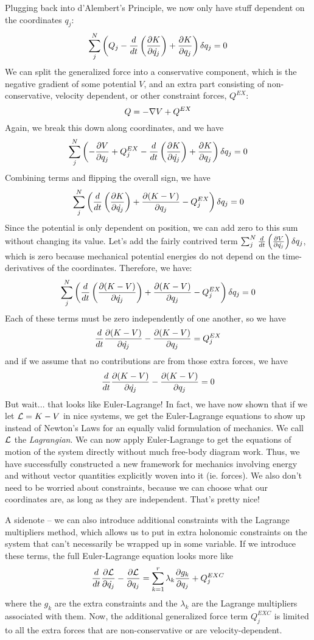 Plugging back into d'Alembert's Principle, we now only have stuff dependent on the coordinates $q_j$:
\[
	\sum_j^N \left(Q_j - \frac{d }{d t} \left( \frac{\partial K}{\partial \dot{q_j}} \right) + \frac{\partial K}{\partial q_j} \right) \delta q_j = 0
\]
We can split the generalized force into a conservative component, which is the negative gradient of some potential $V$, and an extra part consisting of non-conservative, velocity dependent, or other constraint forces, $Q^{EX}$: 
\[
	Q = -\nabla V + Q^{EX}
\]
Again, we break this down along coordinates, and we have
\[
	\sum_j^N \left(-\frac{\partial V}{\partial q_j} + Q^{EX}_j - \frac{d }{d t} \left( \frac{\partial K}{\partial \dot{q_j}} \right) + \frac{\partial K}{\partial q_j} \right) \delta q_j = 0
\]
Combining terms and flipping the overall sign, we have
\[
\sum_j^N \left(\frac{d }{d t} \left( \frac{\partial K}{\partial \dot{q_j}} \right) + \frac{\partial (K-V)}{\partial q_j} - Q^{EX}_j \right) \delta q_j = 0
\]
Since the potential is only dependent on position, we can add zero to this sum without changing its value. Let's add the fairly contrived term $\sum_j^N \frac{d }{d t} \left(\frac{\partial V}{\partial \dot{q_j}}  \right) \delta q_j $, which is zero because mechanical potential energies do not depend on the time-derivatives of the coordinates. Therefore, we have: 
\[
\sum_j^N \left(\frac{d }{d t} \left( \frac{\partial (K-V)}{\partial \dot{q_j}} \right) + \frac{\partial (K-V)}{\partial q_j} - Q^{EX}_j \right) \delta q_j = 0
\]
Each of these terms must be zero independently of one another, so we have
\[
	\frac{d }{d t}\frac{\partial (K-V)}{\partial \dot{q_j}} - \frac{\partial (K-V)}{\partial q_j} = Q^{EX}_j 
\]
and if we assume that no contributions are from those extra forces, we have
\[
\frac{d }{d t}\frac{\partial (K-V)}{\partial \dot{q_j}} - \frac{\partial (K-V)}{\partial q_j} = 0 
\]
But wait... that looks like Euler-Lagrange! In fact, we have now shown that if we let $\mathcal{L} = K - V$ in nice systems, we get the Euler-Lagrange equations to show up instead of Newton's Laws for an equally valid formulation of mechanics. We call $\mathcal{L}$ the \textit{Lagrangian}. We can now apply Euler-Lagrange to get the equations of motion of the system directly without much free-body diagram work. Thus, we have successfully constructed a new framework for mechanics involving energy and without vector quantities explicitly woven into it (ie. forces). We also don't need to be worried about constraints, because we can choose what our coordinates are, as long as they are independent. That's pretty nice! 

A sidenote -- we can also introduce additional constraints with the Lagrange multipliers method, which allows us to put in extra holonomic constraints on the system that can't necessarily be wrapped up in some variable. If we introduce these terms, the full Euler-Lagrange equation looks more like 
\[
	\frac{d }{d t}\frac{\partial \mathcal{L}}{\partial \dot{q_j}} - \frac{\partial \mathcal{L}}{\partial q_j} = \sum_{k=1}^r \lambda_k \frac{\partial g_k}{\partial q_j} + Q^{EXC}_j
\]
where the $g_k$ are the extra constraints and the $\lambda_k$ are the Lagrange multipliers associated with them. Now, the additional generalized force term $Q^{EXC}_j$ is limited to all the extra forces that are non-conservative or are velocity-dependent. 


